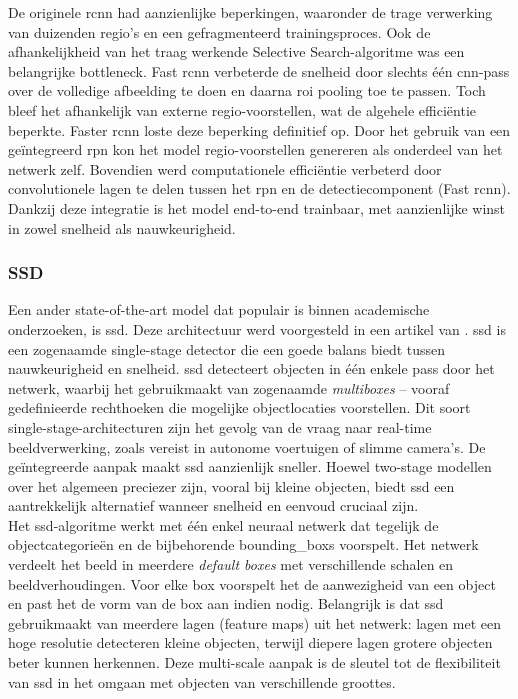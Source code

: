 De originele \gls{rcnn} had aanzienlijke beperkingen, waaronder de trage verwerking van duizenden regio’s en een gefragmenteerd trainingsproces. Ook de afhankelijkheid van het traag werkende Selective Search-algoritme was een belangrijke bottleneck. Fast \gls{rcnn} verbeterde de snelheid door slechts één \gls{cnn}-pass over de volledige afbeelding te doen en daarna \gls{roi} pooling toe te passen. Toch bleef het afhankelijk van externe regio-voorstellen, wat de algehele efficiëntie beperkte. Faster \gls{rcnn} loste deze beperking definitief op. Door het gebruik van een geïntegreerd \gls{rpn} kon het model regio-voorstellen genereren als onderdeel van het netwerk zelf. Bovendien werd computationele efficiëntie verbeterd door convolutionele lagen te delen tussen het \gls{rpn} en de detectiecomponent (Fast \gls{rcnn}). Dankzij deze integratie is het model end-to-end trainbaar, met aanzienlijke winst in zowel snelheid als nauwkeurigheid.

\subsubsection{SSD}

Een ander state-of-the-art model dat populair is binnen academische onderzoeken, is \gls{ssd}. Deze architectuur werd voorgesteld in een artikel van \textcite{Liu_2016}. \gls{ssd} is een zogenaamde single-stage detector die een goede balans biedt tussen nauwkeurigheid en snelheid. \gls{ssd} detecteert objecten in één enkele pass door het netwerk, waarbij het gebruikmaakt van zogenaamde \emph{multiboxes} -- vooraf gedefinieerde rechthoeken die mogelijke objectlocaties voorstellen. Dit soort single-stage-architecturen zijn het gevolg van de vraag naar real-time beeldverwerking, zoals vereist in autonome voertuigen of slimme camera's. De geïntegreerde aanpak maakt \gls{ssd} aanzienlijk sneller. Hoewel two-stage modellen over het algemeen preciezer zijn, vooral bij kleine objecten, biedt \gls{ssd} een aantrekkelijk alternatief wanneer snelheid en eenvoud cruciaal zijn. \\

Het \gls{ssd}-algoritme werkt met één enkel neuraal netwerk dat tegelijk de objectcategorieën en de bijbehorende \glspl{bounding_box} voorspelt. Het netwerk verdeelt het beeld in meerdere \emph{default boxes} met verschillende schalen en beeldverhoudingen. Voor elke box voorspelt het de aanwezigheid van een object en past het de vorm van de box aan indien nodig. Belangrijk is dat \gls{ssd} gebruikmaakt van meerdere lagen (feature maps) uit het netwerk: lagen met een hoge resolutie detecteren kleine objecten, terwijl diepere lagen grotere objecten beter kunnen herkennen. Deze multi-scale aanpak is de sleutel tot de flexibiliteit van \gls{ssd} in het omgaan met objecten van verschillende groottes. \\

